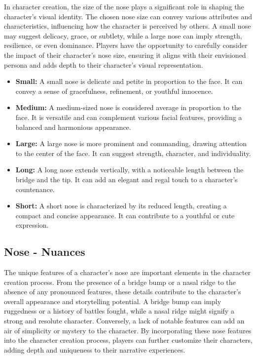 In character creation, the size of the nose plays a significant role in shaping the character's visual identity. The chosen nose size can convey various attributes and characteristics, influencing how the character is perceived by others. A small nose may suggest delicacy, grace, or subtlety, while a large nose can imply strength, resilience, or even dominance. Players have the opportunity to carefully consider the impact of their character's nose size, ensuring it aligns with their envisioned persona and adds depth to their character's visual representation.

\begin{itemize}
    \item \textbf{Small:} A small nose is delicate and petite in proportion to the face. It can convey a sense of gracefulness, refinement, or youthful innocence.
    \item \textbf{Medium:} A medium-sized nose is considered average in proportion to the face. It is versatile and can complement various facial features, providing a balanced and harmonious appearance.
    \item \textbf{Large:} A large nose is more prominent and commanding, drawing attention to the center of the face. It can suggest strength, character, and individuality.
    \item \textbf{Long:} A long nose extends vertically, with a noticeable length between the bridge and the tip. It can add an elegant and regal touch to a character's countenance.
    \item \textbf{Short:} A short nose is characterized by its reduced length, creating a compact and concise appearance. It can contribute to a youthful or cute expression.
\end{itemize}

\subsection{\textbf{Nose - Nuances}}

The unique features of a character's nose are important elements in the character creation process. From the presence of a bridge bump or a nasal ridge to the absence of any pronounced features, these details contribute to the character's overall appearance and storytelling potential. A bridge bump can imply ruggedness or a history of battles fought, while a nasal ridge might signify a strong and resolute character. Conversely, a lack of notable features can add an air of simplicity or mystery to the character. By incorporating these nose features into the character creation process, players can further customize their characters, adding depth and uniqueness to their narrative experiences.


